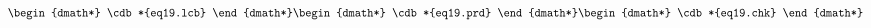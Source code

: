 \documentclass[12pt]{cdblatex}
\begin{document}

\begin{dgroup*}
   \begin{dmath*} \cdb*{eq19.lcb} \end{dmath*}
   \begin{dmath*} \cdb*{eq19.prd} \end{dmath*}
   \begin{dmath*} \cdb*{eq19.chk} \end{dmath*}
\end{dgroup*}
\end{document}
